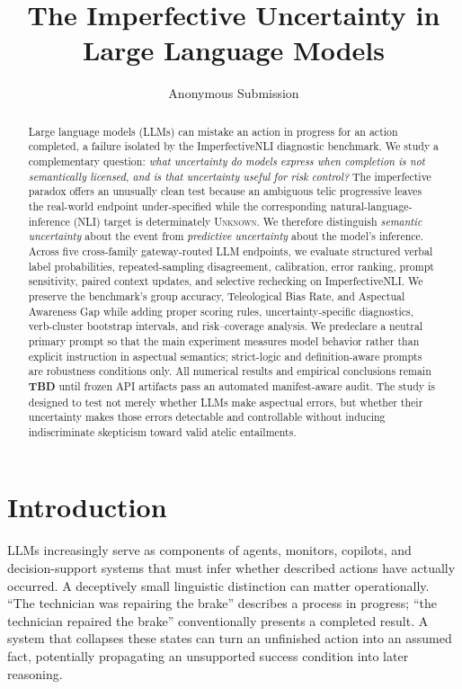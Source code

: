 \documentclass[letterpaper]{article}
\title{The Imperfective Uncertainty in Large Language Models}
\author{Anonymous Submission}
\begin{document}
\maketitle

\begin{abstract}
Large language models (LLMs) can mistake an action in progress for an action completed, a failure isolated by the ImperfectiveNLI diagnostic benchmark. We study a complementary question: \emph{what uncertainty do models express when completion is not semantically licensed, and is that uncertainty useful for risk control?} The imperfective paradox offers an unusually clean test because an ambiguous telic progressive leaves the real-world endpoint under-specified while the corresponding natural-language-inference (NLI) target is determinately \textsc{Unknown}. We therefore distinguish \emph{semantic uncertainty} about the event from \emph{predictive uncertainty} about the model's inference. Across five cross-family gateway-routed LLM endpoints, we evaluate structured verbal label probabilities, repeated-sampling disagreement, calibration, error ranking, prompt sensitivity, paired context updates, and selective rechecking on ImperfectiveNLI. We preserve the benchmark's group accuracy, Teleological Bias Rate, and Aspectual Awareness Gap while adding proper scoring rules, uncertainty-specific diagnostics, verb-cluster bootstrap intervals, and risk--coverage analysis. We predeclare a neutral primary prompt so that the main experiment measures model behavior rather than explicit instruction in aspectual semantics; strict-logic and definition-aware prompts are robustness conditions only. All numerical results and empirical conclusions remain \textbf{TBD} until frozen API artifacts pass an automated manifest-aware audit. The study is designed to test not merely whether LLMs make aspectual errors, but whether their uncertainty makes those errors detectable and controllable without inducing indiscriminate skepticism toward valid atelic entailments.
\end{abstract}

\section{Introduction}
LLMs increasingly serve as components of agents, monitors, copilots, and decision-support systems that must infer whether described actions have actually occurred. A deceptively small linguistic distinction can matter operationally. ``The technician was repairing the brake'' describes a process in progress; ``the technician repaired the brake'' conventionally presents a completed result. A system that collapses these states can turn an unfinished action into an assumed fact, potentially propagating an unsupported success condition into later reasoning.
\end{document}
